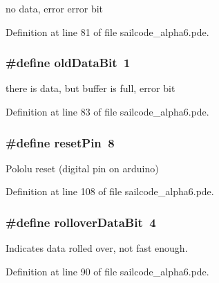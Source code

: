 no data, error error bit 



\-Definition at line 81 of file sailcode\-\_\-alpha6.\-pde.

\hypertarget{group__globalconstants_gaed67540d9d2621c3a21a0f6eb8b75d01}{
\subsubsection[{old\-Data\-Bit}]{\setlength{\rightskip}{0pt plus 5cm}\#define old\-Data\-Bit~1}}
\label{group__globalconstants_gaed67540d9d2621c3a21a0f6eb8b75d01}


there is data, but buffer is full, error bit 



\-Definition at line 83 of file sailcode\-\_\-alpha6.\-pde.

\hypertarget{group__globalconstants_gad67ff299260393832da3b34efaaee56a}{
\subsubsection[{reset\-Pin}]{\setlength{\rightskip}{0pt plus 5cm}\#define reset\-Pin~8}}
\label{group__globalconstants_gad67ff299260393832da3b34efaaee56a}


\-Pololu reset (digital pin on arduino) 



\-Definition at line 108 of file sailcode\-\_\-alpha6.\-pde.

\hypertarget{group__globalconstants_ga72f54d1e0beda470c8361ba984148900}{
\subsubsection[{rollover\-Data\-Bit}]{\setlength{\rightskip}{0pt plus 5cm}\#define rollover\-Data\-Bit~4}}
\label{group__globalconstants_ga72f54d1e0beda470c8361ba984148900}


\-Indicates data rolled over, not fast enough. 



\-Definition at line 90 of file sailcode\-\_\-alpha6.\-pde.

